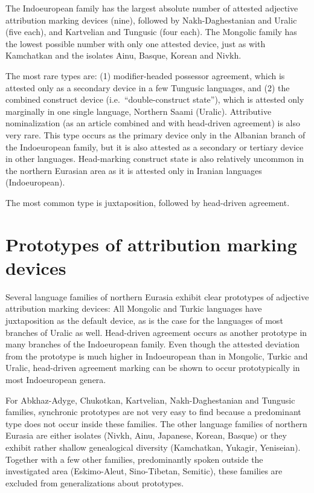The Indoeuropean family has the largest absolute number of attested adjective attribution marking devices (nine), followed by Nakh-Daghestanian and Uralic (five each), and Kartvelian and Tungusic (four each). The Mongolic family has the lowest possible number with only one attested device, just as with Kamchatkan and the isolates Ainu, Basque, Korean and Nivkh.

The most rare types are:  (1) modifier-headed possessor agreement, which is attested only as a secondary device in a few Tungusic languages, and (2) the combined construct device (i.e.~“double-construct state”), which is attested only marginally in one single language, Northern Saami (Uralic). Attributive nominalization (as an article combined and with head-driven agreement) is also very rare. This type occurs as the primary device only in the Albanian branch of the Indoeuropean family, but it is also attested as a secondary or tertiary device in other languages. Head-marking construct state is also relatively uncommon in the northern Eurasian area as it is attested only in Iranian languages (Indoeuropean).

The most common type is juxtaposition, followed by head-driven agreement.

\section{Prototypes of attribution marking devices}
Several language families of northern Eurasia exhibit clear prototypes of adjective attribution marking devices: All Mongolic and Turkic languages have juxtaposition as the default device, as is the case for the languages of most branches of Uralic as well. Head-driven agreement occurs as another prototype in many branches of the Indoeuropean family. Even though the attested deviation from the prototype is much higher in Indoeuropean than in Mongolic, Turkic and Uralic, head-driven agreement marking can be shown to occur prototypically in most Indoeuropean genera.

For Abkhaz-Adyge, Chukotkan, Kartvelian, Nakh-Daghestanian and Tungusic families, synchronic prototypes are not very easy to find because a predominant type does not occur inside these families. The other language families of northern Eurasia are either isolates (Nivkh, Ainu, Japanese, Korean, Basque) or they exhibit rather shallow genealogical diversity (Kamchatkan, Yukagir, Yeniseian). Together with a few other families, predominantly spoken outside the investigated area (Eskimo-Aleut, Sino-Tibetan, Semitic), these families are excluded from generalizations about prototypes. 

